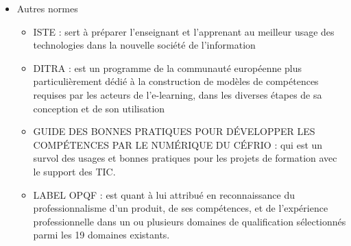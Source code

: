 \begin{frame}[allowframebreaks]
\begin{description}
\begin{itemize}
							\item Autres normes
								\begin{itemize}
								\item ISTE : sert à préparer l’enseignant et l’apprenant au meilleur usage des technologies dans la nouvelle société de l’information
								\item DITRA : est un programme de la communauté européenne plus particulièrement dédié à la construction de modèles de compétences requises par les acteurs de l’e-learning, dans les diverses étapes de sa conception et de son utilisation
								\item GUIDE DES BONNES PRATIQUES POUR DÉVELOPPER LES COMPÉTENCES PAR LE NUMÉRIQUE DU CÉFRIO : qui est un survol des usages et bonnes pratiques pour les projets de formation avec le support des TIC. 
								\item LABEL OPQF : est quant à lui attribué en reconnaissance du professionnalisme d’un produit, de ses compétences, et de l’expérience professionnelle dans un ou plusieurs domaines de qualification sélectionnés parmi les 19 domaines existants.
								\end{itemize}
							\end{itemize}						
						\end{description}
		 \end{frame}   
		 
